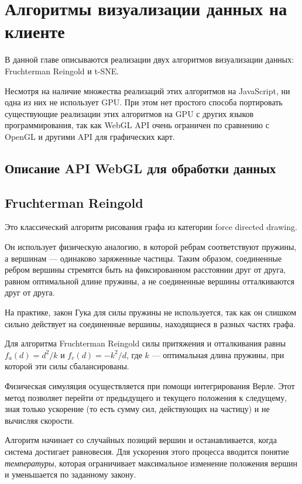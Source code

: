 


\chapter{Алгоритмы визуализации данных на клиенте}

В данной главе описываются реализации двух алгоритмов визуализации данных: Fruchterman Reingold и t-SNE.

Несмотря на наличие множества реализаций этих алгоритмов на JavaScript, ни одна из них не использует GPU. При этом нет простого способа портировать существующие реализации этих алгоритмов на GPU с других языков программирования, так как WebGL API очень ограничен по сравнению с OpenGL и другими API для графических карт.

\section{Описание API WebGL для обработки данных}



\section{Fruchterman Reingold}

Это классический алгоритм рисования графа из категории force directed drawing.

Он использует физическую аналогию, в которой ребрам соответствуют пружины, а вершинам --- одинаково заряженные частицы. Таким образом, соединенные ребром вершины стремятся быть на фиксированном расстоянии друг от друга, равном оптимальной длине пружины, а не соединенные вершины отталкиваются друг от друга.

На практике, закон Гука для силы пружины не используется, так как он слишком сильно действует на соединенные вершины, находящиеся в разных частях графа.

Для алгоритма Fruchterman Reingold силы притяжения и отталкивания равны $f_a(d) = d^2 / k$ и $f_r(d) = -k^2 / d$, где $k$ --- оптимальная длина пружины, при которой эти силы сбалансированы.

Физическая симуляция осуществляется при помощи интегрирования Верле. Этот метод позволяет перейти от предыдущего и текущего положения к следущему, зная только ускорение (то есть сумму сил, действующих на частицу) и не вычисляя скорости.

Алгоритм начинает со случайных позиций вершин и останавливается, когда система достигает равновесия. Для ускорения этого процесса вводится понятие {\itshape температуры}, которая ограничивает максимальное изменение положения вершин и уменьшается по заданному закону.

